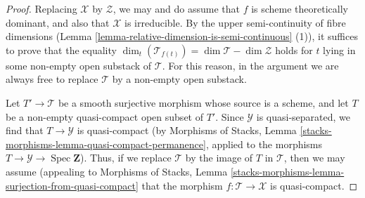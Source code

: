 \documentclass{stacks-project}
\theoremstyle{plain}
\theoremstyle{definition}
\theoremstyle{remark}
\numberwithin{equation}{subsection}
\def\Spec{\mathop{\mathrm{Spec}}}
\begin{document}
\begin{proof}
Replacing $\mathcal{X}$ by $\mathcal{Z}$, we may and do assume that $f$ is
scheme theoretically dominant,
and also that $\mathcal{X}$ is irreducible.
By the upper semi-continuity of fibre dimensions
(Lemma \ref{lemma-relative-dimension-is-semi-continuous} (1)),
it suffices to prove that the equality
$\dim_t( \mathcal{T}_{f(t)}) =\dim \mathcal{T}  - \dim \mathcal{Z}$
holds for $t$ lying in
some non-empty open substack of $\mathcal{T}$.
For this reason, in the argument we are always free
to replace $\mathcal{T}$ by a non-empty open substack.

\medskip\noindent
Let $T' \to \mathcal{T}$ be a smooth surjective morphism whose source
is a scheme, and let $T$ be a non-empty quasi-compact open subset
of $T'$.  Since $\mathcal{Y}$ is quasi-separated, we find
that $T \to  \mathcal{Y}$ is quasi-compact
(by Morphisms of Stacks, Lemma
\ref{stacks-morphisms-lemma-quasi-compact-permanence}, applied to the morphisms
$T \to \mathcal{Y} \to \Spec \mathbf{Z}$).
Thus, if we replace $\mathcal{T}$ by the image of $T$ in $\mathcal{T}$,
then we may assume (appealing to
Morphisms of Stacks, Lemma
\ref{stacks-morphisms-lemma-surjection-from-quasi-compact}
that the morphism $f:\mathcal{T} \to \mathcal{X}$ is quasi-compact.


\end{proof}
\end{document}
